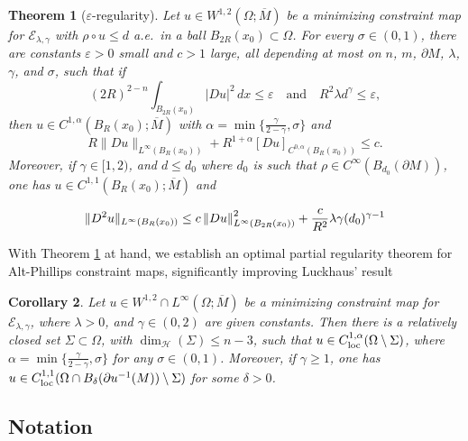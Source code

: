 \documentclass[11pt]{amsart}
\newcommand{\cE}{{\mathcal E}}
\newcommand{\cH}{{\mathcal H}}
\def\loc{{\textup{loc}}}
\def\loc{{\textup{loc}}}
\newcommand{\e}{\varepsilon}
\newcommand\norm[1]{\left\Arrowvert {#1} \right\Arrowvert}
\theoremstyle{plain}
\newtheorem{thm}{Theorem}[section]
\newtheorem{cor}[thm]{Corollary}
\theoremstyle{definition}
\theoremstyle{remark}
\numberwithin{equation}{section}
\begin{document}
\begin{thm}[\texorpdfstring{$\e$-regularity}{e-regularity}]
\label{thm:e-reg}
Let $u\in W^{1,2}(\Omega;\overline M)$ be a minimizing constraint map for $\cE_{\lambda,\gamma}$ with $\rho\circ u\leq d$ a.e.\ in a ball $B_{2R}(x_0)\subset\Omega$. For every $\sigma\in(0,1)$, there are constants $\e > 0$ small and $c > 1$ large, all depending at most on $n$, $m$, $\partial M$, $\lambda$,  $\gamma$, and $\sigma$, such that if 
$$
(2R)^{2-n} \int_{B_{2R}(x_0)} |Du|^2\,dx \leq \e \quad\text{and}\quad R^2\lambda d^\gamma \leq \e,
$$
then $u\in C^{1,\alpha}(B_R(x_0);\overline M)$ with $\alpha = \min\{\frac{\gamma}{2-\gamma},\sigma\}$ and 
    $$
    R\| Du \|_{L^\infty(B_R(x_0))} + R^{1+\alpha} [ Du ]_{C^{0,\alpha}(B_R(x_0))}\leq c.
    $$
Moreover, if $\gamma\in[1,2)$, and $d \leq d_0$ where $d_0$ is such that $\rho\in C^\infty(B_{d_0}(\partial M))$, one has $u\in C^{1,1}(B_R(x_0);\overline M)$ and 

$$
\| D^2 u\|_{L^\infty(B_R(x_0))} \leq c\norm{Du}_{L^\infty(B_{2R}(x_0))}^2 + \frac{c}{R^2}\lambda \gamma (d_0)^{\gamma-1}
$$

\end{thm}

With Theorem \ref{thm:e-reg} at hand, we establish an optimal partial regularity theorem for Alt-Phillips constraint maps, significantly improving Luckhaus' result \cite{L} 


\begin{cor}
    \label{cor:partial}
    Let $u\in W^{1,2}\cap L^\infty(\Omega;\overline M)$ be a minimizing constraint map for $\cE_{\lambda,\gamma}$, where $\lambda > 0$, and $\gamma \in (0,2)$ are given constants. Then there is a relatively closed set $\Sigma\subset\Omega$, with $\dim_\cH(\Sigma) \leq n-3$, such that $u\in C_\loc^{1,\alpha}(\Omega\setminus\Sigma)$, where $\alpha = \min\{\frac{\gamma}{2-\gamma},\sigma\}$ for any $\sigma\in(0,1)$. Moreover, if $\gamma\geq 1$, one has $u\in C_\loc^{1,1}(\Omega\cap B_\delta(\partial u^{-1}(M))\setminus\Sigma)$ for some $\delta > 0$. 
\end{cor}



\subsection{Notation}\label{sec:notation1}
\end{document}
